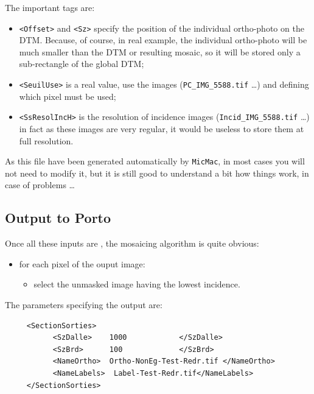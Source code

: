 The important tags are:

\begin{itemize}
   \item {\tt <Offset>} and {\tt <Sz>} specify the position of the individual ortho-photo
         on the DTM. Because, of course, in real example, the individual ortho-photo  will be much smaller
         than the DTM or resulting mosaic, so it will be stored only a sub-rectangle of the global DTM;

   \item {\tt <SeuilUse>} is a real value, use  the  images ({\tt PC\_IMG\_5588.tif} \dots) and
         defining which pixel must be used;

   \item {\tt <SsResolIncH>} is the resolution of incidence images ({\tt Incid\_IMG\_5588.tif} \dots)
         in fact as these images are very regular, it would be useless to store them at full resolution.
         
\end{itemize}


As this file have been generated automatically by {\tt MicMac}, in most cases you will
not need to modify it, but it is still good to understand a bit how things work,
in case of problems \dots



\subsection{Output to Porto}

Once  all these inputs are , %
the mosaicing
algorithm is quite obvious:

\begin{itemize}
     \item for each pixel of  the ouput image:
     \begin{itemize}
          \item select the unmasked image having the lowest incidence.
     \end{itemize}
\end{itemize}

The parameters specifying the output are:

{\scriptsize
\begin{verbatim}
     <SectionSorties>
           <SzDalle>    1000            </SzDalle>
           <SzBrd>      100             </SzBrd>
           <NameOrtho>  Ortho-NonEg-Test-Redr.tif </NameOrtho>
           <NameLabels>  Label-Test-Redr.tif</NameLabels>
     </SectionSorties>
\end{verbatim}
}

